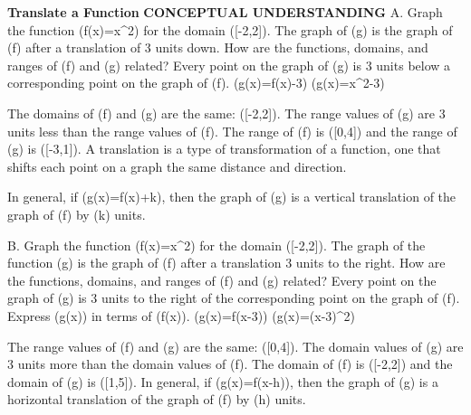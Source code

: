 \documentclass{article}
\newenvironment{example}[1]{}{}         %
\newcommand{\answer}[1]{}               %
\newcommand{\placeholder}[2]{}          %
\newcommand{\te}[1]{}                   %
\begin{document}
\begin{example}{1}
\textbf{Translate a Function}
\textbf{CONCEPTUAL UNDERSTANDING}
A. Graph the function (f(x)=x^2) for the domain ([-2,2]). The graph of (g) is the graph of (f) after a translation of 3 units down. How are the functions, domains, and ranges of (f) and (g) related?
Every point on the graph of (g) is 3 units below a corresponding point on the graph of (f).
(g(x)=f(x)-3)
(g(x)=x^2-3)
\placeholder{graph}{Example 1A: blue parabola f(x)=x^2 from filled (-2,4) to filled (2,4), vertex (0,0); red parabola g(x)=x^2-3 from filled (-2,1) to filled (2,1), vertex (0,-3). Filled corresponding points (1,1) and (1,-2) labeled (x,f(x)) and (x,g(x)). Unit square grid, x/y axes arrowed; labels -4,-2,2,4 on x and -4,2,4 on y, origin O; window approximately [-5,5] by [-5,5].}
\te{Callout: The difference between (f(x)) and (g(x)) is 3.}
The domains of (f) and (g) are the same: ([-2,2]). The range values of (g) are 3 units less than the range values of (f). The range of (f) is ([0,4]) and the range of (g) is ([-3,1]).
A translation is a type of transformation of a function, one that shifts each point on a graph the same distance and direction.
\te{Callout: Other types of transformations include reflections, stretches, and compressions.}
In general, if (g(x)=f(x)+k), then the graph of (g) is a vertical translation of the graph of (f) by (k) units.
\te{LOOK FOR RELATIONSHIPS: This type of transformation slides the graph up or down. You could perform a transformation like this to a non-vertical line and produce a parallel line.}
\answer{A. (g(x)=x^2-3); both domains ([-2,2]); range of (f): ([0,4]); range of (g): ([-3,1]).}
B. Graph the function (f(x)=x^2) for the domain ([-2,2]). The graph of the function (g) is the graph of (f) after a translation 3 units to the right. How are the functions, domains, and ranges of (f) and (g) related?
Every point on the graph of (g) is 3 units to the right of the corresponding point on the graph of (f). Express (g(x)) in terms of (f(x)).
(g(x)=f(x-3))
(g(x)=(x-3)^2)
\placeholder{graph}{Example 1B: blue f(x)=x^2 on [-2,2], filled endpoints (-2,4),(2,4), vertex (0,0); green g(x)=(x-3)^2 on [1,5], filled endpoints (1,4),(5,4), vertex (3,0). Filled points (1,1) and (4,1) labeled (x,f(x)) and (x,g(x)) joined by horizontal dashed segment. Unit grid; x/y axes arrowed, origin O, x labels -4,-2,2,4,6 and y labels -4,-2,2,4. Window approximately x=-5 to 7,y=-5 to 5.}
\te{Callout: The difference between x-coordinates is 3, but the y-coordinates are the same.}
The range values of (f) and (g) are the same: ([0,4]). The domain values of (g) are 3 units more than the domain values of (f). The domain of (f) is ([-2,2]) and the domain of (g) is ([1,5]).
In general, if (g(x)=f(x-h)), then the graph of (g) is a horizontal translation of the graph of (f) by (h) units.
\answer{B. (g(x)=(x-3)^2); both ranges ([0,4]); domain of (f): ([-2,2]); domain of (g): ([1,5]).}
\end{example}
\end{document}

